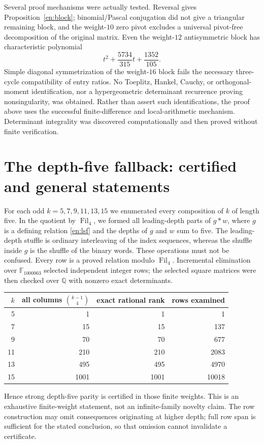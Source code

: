 \documentclass[12pt]{amsart}
\theoremstyle{definition}
\theoremstyle{remark}
\numberwithin{equation}{section}
\newcommand{\Q}{\mathbb{Q}}
\newcommand{\Fil}{\operatorname{Fil}}
\theoremstyle{definition}
\theoremstyle{remark}
\begin{document}
Several proof mechanisms were actually tested. Reversal gives
Proposition~\ref{en:block}; binomial/Pascal conjugation did not give a
triangular remaining block, and the weight-$10$ zero pivot excludes a
universal pivot-free decomposition of the original matrix. Even the
weight-$12$ antisymmetric block has characteristic polynomial
\[
 t^2+\frac{5734}{315}t+\frac{1352}{105}.
\]
Simple diagonal symmetrization of the weight-$16$ block fails the
necessary three-cycle compatibility of entry ratios. No Toeplitz,
Hankel, Cauchy, or orthogonal-moment identification, nor a hypergeometric
determinant recurrence proving nonsingularity, was obtained. Rather than
assert such identifications, the proof above uses the successful
finite-difference and local-arithmetic mechanism. Determinant integrality
was discovered computationally and then proved without finite verification.

\section{The depth-five fallback: certified and general statements}
For each odd $k=5,7,9,11,13,15$ we enumerated every composition of $k$
of length five. In the quotient by $\Fil_4$, we formed all leading-depth
parts of $g*w$, where $g$ is a defining relation \eqref{en:lsf} and
the depths of $g$ and $w$ sum to five. The leading-depth stuffle is
ordinary interleaving of the index sequences, whereas the shuffle inside
$g$ is the shuffle of the binary words. These operations must not be
confused. Every row is a proved relation modulo $\Fil_4$.
Incremental elimination over $\mathbb F_{1000003}$ selected independent
integer rows; the selected square matrices were then checked over
$\Q$ with nonzero exact determinants.
\begin{center}
\begin{tabular}{rrrr}
\toprule
$k$&all columns $\binom{k-1}{4}$&exact rational rank&rows examined\\
\midrule
5&1&1&1\\7&15&15&137\\9&70&70&677\\
11&210&210&2083\\13&495&495&4970\\15&1001&1001&10018\\
\bottomrule
\end{tabular}
\end{center}
Hence strong depth-five parity is certified in those finite weights.
This is an exhaustive finite-weight statement, not an infinite-family
novelty claim. The row construction may omit consequences originating
at higher depth; full row span is sufficient for the stated conclusion,
so that omission cannot invalidate a certificate.
\end{document}
